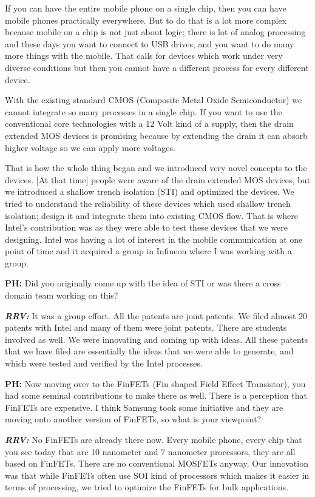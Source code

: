 If you can have the entire mobile phone on a single chip, then you can have mobile phones practically everywhere. But to do that is a lot more complex because mobile on a chip is not just about logic; there is lot of analog processing and these days you want to connect to USB drives, and you want to do many more things with the mobile.  That calls for devices which work under very diverse conditions but then you cannot have a different process for every different device.

With the existing standard CMOS (Composite Metal  Oxide Semiconductor) we cannot integrate so many processes in a single chip. If you want to use the conventional core technologies with a 12 Volt kind of a supply, then the drain extended MOS devices is promising because by extending the drain it can absorb higher voltage so we can apply more voltages.

That is how the whole thing began and we introduced very novel concepts to the devices. [At that time] people were aware of the drain extended MOS devices, but we introduced a shallow trench isolation (STI) and optimized the devices. We tried to understand the reliability of these devices which used shallow trench isolation; design it and integrate them into existing CMOS flow. That is where Intel’s contribution was as they were able to test these devices that we were designing. Intel was having a lot of interest in the mobile communication at one point of time and it acquired a group in Infineon where I was working with a group.

\newpage

\textbf{PH:} Did you originally come up with the idea of STI or was there a cross domain team working on this?

\textbf{\textit{RRV:}} It was a group effort. All the patents are joint patents. We filed almost 20 patents with Intel and many of them were joint patents. There are students involved as well. We were innovating and coming up with ideas. All these patents that we have filed are essentially the ideas that we were able to generate, and which were tested and verified by the Intel processes.

\textbf{PH:} Now moving over to the FinFETs (Fin shaped Field Effect Transistor), you had some seminal contributions to make there as well. There is a perception that FinFETs are expensive. I think Samsung took some initiative and they are moving onto another version of FinFETs, so what is your viewpoint?

\textbf{\textit{RRV:}} No FinFETs are already there now. Every mobile phone, every chip that you see today that are 10 nanometer and 7 nanometer processors, they are all based on FinFETs. There are no conventional MOSFETs anyway. Our innovation was that while FinFETs often use SOI kind of processors which makes it easier in terms of processing, we tried to optimize the FinFETs for bulk applications.

